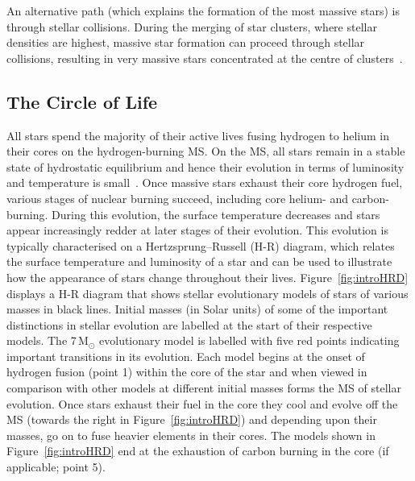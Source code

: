 An alternative path (which explains the formation of the most massive stars) is through stellar collisions.
During the merging of star clusters, where stellar densities are highest, massive star formation can proceed through stellar collisions, resulting in very massive stars concentrated at the centre of clusters~\citep{Fujii13}.



\subsection{The Circle of Life} %
\label{sub:life_cycle}

All stars spend the majority of their active lives fusing hydrogen to helium in their cores on the hydrogen-burning MS.
On the MS, all stars remain in a stable state of hydrostatic equilibrium and hence their evolution in terms of luminosity and temperature is small~\citep{2012sse..book.....K}.
Once massive stars exhaust their core hydrogen fuel, various stages of nuclear burning succeed, including core helium- and carbon-burning.
During this evolution, the surface temperature decreases and stars appear increasingly redder at later stages of their evolution.
This evolution is typically characterised on a Hertzsprung--Russell (H-R) diagram, which relates the surface temperature and luminosity of a star and can be used to illustrate how the appearance of stars change throughout their lives.
Figure~\ref{fig:introHRD} displays a H-R diagram that shows stellar evolutionary models of stars of various masses in black lines.
Initial masses (in Solar units) of some of the important distinctions in stellar evolution are labelled at the start of their respective models.
The 7\,M$_{\odot}$ evolutionary model is labelled with five red points indicating important transitions in its evolution.
Each model begins at the onset of hydrogen fusion (point 1) within the core of the star and when viewed in comparison with other models at different initial masses forms the MS of stellar evolution.
Once stars exhaust their fuel in the core they cool and evolve off the MS (towards the right in Figure~\ref{fig:introHRD}) and depending upon their masses, go on to fuse heavier elements in their cores.
The models shown in Figure~\ref{fig:introHRD} end at the exhaustion of carbon burning in the core (if applicable; point 5).


